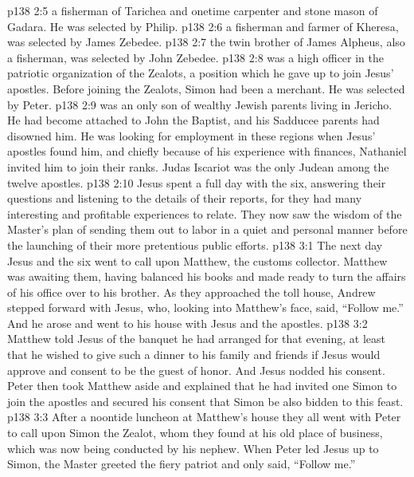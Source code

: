 \vs p138 2:5 \pc {}\bibnobreakspace {} a fisherman of Tarichea and onetime carpenter and stone mason of Gadara. He was selected by Philip.
\vs p138 2:6 \pc {}\bibnobreakspace {} a fisherman and farmer of Kheresa, was selected by James Zebedee.
\vs p138 2:7 \pc {}\bibnobreakspace {} the twin brother of James Alpheus, also a fisherman, was selected by John Zebedee.
\vs p138 2:8 \pc {}\bibnobreakspace {} was a high officer in the patriotic organization of the Zealots, a position which he gave up to join Jesus’ apostles. Before joining the Zealots, Simon had been a merchant. He was selected by Peter.
\vs p138 2:9 \pc {}\bibnobreakspace {} was an only son of wealthy Jewish parents living in Jericho. He had become attached to John the Baptist, and his Sadducee parents had disowned him. He was looking for employment in these regions when Jesus’ apostles found him, and chiefly because of his experience with finances, Nathaniel invited him to join their ranks. Judas Iscariot was the only Judean among the twelve apostles.
\vs p138 2:10 \pc Jesus spent a full day with the six, answering their questions and listening to the details of their reports, for they had many interesting and profitable experiences to relate. They now saw the wisdom of the Master’s plan of sending them out to labor in a quiet and personal manner before the launching of their more pretentious public efforts.
\vs p138 3:1 The next day Jesus and the six went to call upon Matthew, the customs collector. Matthew was awaiting them, having balanced his books and made ready to turn the affairs of his office over to his brother. As they approached the toll house, Andrew stepped forward with Jesus, who, looking into Matthew’s face, said, \textcolor{ubdarkred}{“Follow me.”} And he arose and went to his house with Jesus and the apostles.
\vs p138 3:2 Matthew told Jesus of the banquet he had arranged for that evening, at least that he wished to give such a dinner to his family and friends if Jesus would approve and consent to be the guest of honor. And Jesus nodded his consent. Peter then took Matthew aside and explained that he had invited one Simon to join the apostles and secured his consent that Simon be also bidden to this feast.
\vs p138 3:3 \pc After a noontide luncheon at Matthew’s house they all went with Peter to call upon Simon the Zealot, whom they found at his old place of business, which was now being conducted by his nephew. When Peter led Jesus up to Simon, the Master greeted the fiery patriot and only said, \textcolor{ubdarkred}{“Follow me.”}
